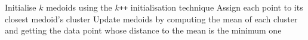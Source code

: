\begin{algorithmic}[1]
    \State Initialise $k$ medoids using the $k$\verb!++! initialisation technique
	\Repeat
		\State Assign each point to its closest medoid's cluster
		\State Update medoids by computing the mean of each cluster and getting the data point whose distance to the mean is the minimum one
\EndProcedure
\end{algorithmic}
